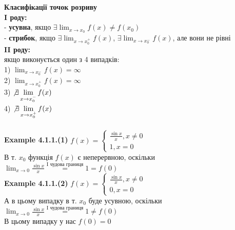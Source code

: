 \documentclass[a4paper, 14pt]{extarticle}
\def\huge{\displaystyle}
\def\bigline{\vspace{5mm}\\}
\def\ex#1{\textbf{Example {#1}}}
\def\bigline{\vspace{5mm}\\}
\begin{document}
\textbf{Класифікації точок розриву}\\
\textbf{I роду:}\\
- \textbf{усувна}, якщо $\exists \huge \lim_{x \to x_0} f(x) \neq f(x_0)$\\
- \textbf{стрибок}, якщо $\exists \huge \lim_{x \to x_0^+} f(x)$, $\exists \huge \lim_{x \to x_0^-} f(x)$, але вони не рівні
\bigline
\textbf{II роду:}\\
якщо виконується один з 4 випадків:\\
1) $\huge \lim_{x \to x_0^-} f(x) = \infty$\\
2) $\huge \lim_{x \to x_0^+} f(x) = \infty$\\
3) $\huge \not\exists \lim_{x \to x_0^-} f(x)$\\
4) $\huge \not\exists \lim_{x \to x_0^+} f(x)$\\
\bigline
\ex{4.1.1.(1)} $f(x) = \begin{cases} \huge \frac{\sin x}{x}, x \neq 0 \\ 1, x = 0 \end{cases}$\\
В т. $x_0$ функція $f(x)$ є неперервною, оскільки
\bigline
$\huge \lim_{x \to 0} \frac{\sin x}{x} \overset{\textrm{I чудова границя}}{=} 1 = f(0)$\\
\ex{4.1.1.(2)} $f(x) = \begin{cases} \huge \frac{\sin x}{x}, x \neq 0 \\ 0, x = 0 \end{cases}$\\
А в цьому випадку в т. $x_0$ буде усувною, оскільки\\
$\huge \lim_{x \to 0} \frac{\sin x}{x} \overset{\textrm{I чудова границя}}{=} 1 \neq f(0)$\\
В цьому випадку у нас $f(0) = 0$\\
\begin{figure} [H]
\centering
\resizebox{1\textwidth}{!}
{
}
\end{figure}
\end{document}
